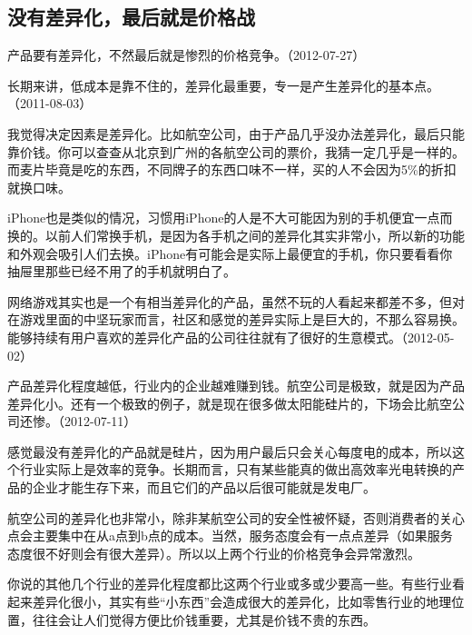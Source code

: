 \subsection{没有差异化，最后就是价格战}

产品要有差异化，不然最后就是惨烈的价格竞争。（2012-07-27）


长期来讲，低成本是靠不住的，差异化最重要，专一是产生差异化的基本点。（2011-08-03）


我觉得决定因素是差异化。比如航空公司，由于产品几乎没办法差异化，最后只能靠价钱。你可以查查从北京到广州的各航空公司的票价，我猜一定几乎是一样的。而麦片毕竟是吃的东西，不同牌子的东西口味不一样，买的人不会因为5\%的折扣就换口味。

iPhone也是类似的情况，习惯用iPhone的人是不大可能因为别的手机便宜一点而换的。以前人们常换手机，是因为各手机之间的差异化其实非常小，所以新的功能和外观会吸引人们去换。iPhone有可能会是实际上最便宜的手机，你只要看看你抽屉里那些已经不用了的手机就明白了。

网络游戏其实也是一个有相当差异化的产品，虽然不玩的人看起来都差不多，但对在游戏里面的中坚玩家而言，社区和感觉的差异实际上是巨大的，不那么容易换。能够持续有用户喜欢的差异化产品的公司往往就有了很好的生意模式。（2012-05-02）

产品差异化程度越低，行业内的企业越难赚到钱。航空公司是极致，就是因为产品差异化小。还有一个极致的例子，就是现在很多做太阳能硅片的，下场会比航空公司还惨。（2012-07-11）


感觉最没有差异化的产品就是硅片，因为用户最后只会关心每度电的成本，所以这个行业实际上是效率的竞争。长期而言，只有某些能真的做出高效率光电转换的产品的企业才能生存下来，而且它们的产品以后很可能就是发电厂。

航空公司的差异化也非常小，除非某航空公司的安全性被怀疑，否则消费者的关心点会主要集中在从a点到b点的成本。当然，服务态度会有一点点差异（如果服务态度很不好则会有很大差异）。所以以上两个行业的价格竞争会异常激烈。

你说的其他几个行业的差异化程度都比这两个行业或多或少要高一些。有些行业看起来差异化很小，其实有些“小东西”会造成很大的差异化，比如零售行业的地理位置，往往会让人们觉得方便比价钱重要，尤其是价钱不贵的东西。

